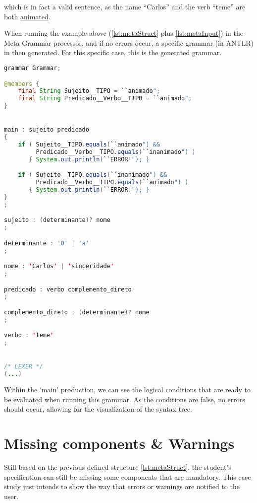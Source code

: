 \noindent which is in fact a valid sentence, as the name ``Carlos'' and the verb ``teme'' are both \underline{animated}.

When running the example above (\autoref{lst:metaStruct} plus \autoref{lst:metaInput}) in the Meta Grammar processor, and if no errors occur, a specific grammar (in ANTLR) 
in then generated. For this specific case, this is the generated grammar.

\begin{center}
\begin{minipage}{10cm}
\begin{lstlisting}[language=java, basicstyle=\tiny, label={lst:case_study_sentence}, caption=Example of a specific generated grammar.]
grammar Grammar;

@members {
    final String Sujeito__TIPO = ``animado";
    final String Predicado__Verbo__TIPO = ``animado";
}


main : sujeito predicado
{
    if ( Sujeito__TIPO.equals(``animado") &&
         Predicado__Verbo__TIPO.equals(``inanimado") ) 
       { System.out.println(``ERROR!"); }

    if ( Sujeito__TIPO.equals(``inanimado") &&
         Predicado__Verbo__TIPO.equals(``animado") ) 
       { System.out.println(``ERROR!"); }
}
;

sujeito : (determinante)? nome 
;

determinante : 'O' | 'a'
;

nome : 'Carlos' | 'sinceridade'
;

predicado : verbo complemento_direto 
;

complemento_direto : (determinante)? nome 
;

verbo : 'teme'
;


/* LEXER */
(...)
\end{lstlisting}
\end{minipage}
\end{center}

Within the ‘main’ production, we can see the logical conditions that are ready to be evaluated when running this grammar. As the conditions are false, no errors should occur,
allowing for the visualization of the syntax tree.



\section{Missing components \& Warnings}
Still based on the previous defined structure \autoref{lst:metaStruct}, the student's specification can still be missing some components that are mandatory. 
This case study just intends to show the way that errors or warnings are notified to the user.

